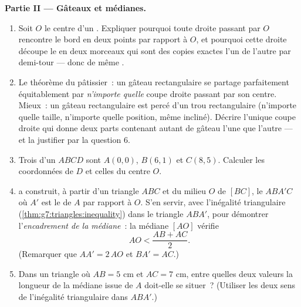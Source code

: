 \begin{problem}
\medskip
\noindent\textbf{Partie II --- Gâteaux et médianes.}
\begin{enumerate}[resume]
  \item Soit $O$ le centre d'un . Expliquer pourquoi
        toute droite passant par $O$ rencontre le bord en deux
        points  par rapport à $O$, et pourquoi cette
        droite découpe le  en deux morceaux qui sont
        des copies exactes l'un de l'autre par demi-tour --- donc de
        même .
  \item Le théorème du pâtissier~: un gâteau rectangulaire se
        partage parfaitement équitablement par \emph{n'importe
        quelle} coupe droite passant par son centre. Mieux~: un
        gâteau rectangulaire est percé d'un trou rectangulaire
        (n'importe quelle taille, n'importe quelle position, même
        incliné). Décrire l'unique coupe droite qui donne deux parts
        contenant autant de gâteau l'une que l'autre --- et la
        justifier par la question 6.
  \item Trois  d'un  $ABCD$ sont $A(0, 0)$,
        $B(6, 1)$ et $C(8, 5)$. Calculer les coordonnées de $D$ et
        celles du centre $O$.
  \item {} a construit, à partir d'un triangle
        $ABC$ et du milieu $O$ de $[BC]$, le  $ABA'C$
        où $A'$ est le  de $A$ par rapport à $O$. S'en
        servir, avec l'inégalité triangulaire
        (\cref{thm:g7:triangles:inequality}) dans le triangle
        $ABA'$, pour démontrer l'\emph{encadrement de la médiane}~:
        la médiane $[AO]$ vérifie
        \[
        AO < \frac{AB + AC}{2} .
        \]
        (Remarquer que $AA' = 2\,AO$ et $BA' = AC$.)
  \item Dans un triangle où $AB = 5$ cm et $AC = 7$ cm, entre
        quelles deux valeurs la longueur de la médiane issue de $A$
        doit-elle se situer~? (Utiliser les deux sens de l'inégalité
        triangulaire dans $ABA'$.)
\end{enumerate}


\end{problem}

